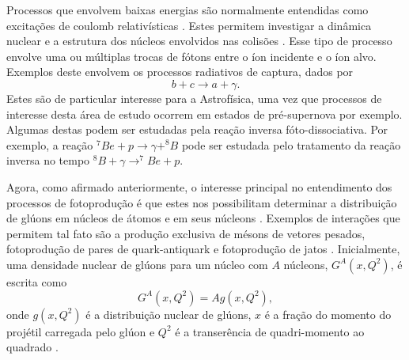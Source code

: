 \begin{table}[h]
\end{table}

Processos que envolvem baixas energias são normalmente entendidas como
excitações de coulomb relativísticas \cite{BERTULANI1988299}. Estes permitem
investigar a dinâmica nuclear e a estrutura dos núcleos envolvidos nas colisões
\cite{bertulani2005}.  Esse tipo de processo envolve uma ou múltiplas trocas
de fótons entre o íon incidente e o íon alvo. Exemplos deste envolvem os
processos radiativos de captura, dados por
\begin{equation}
	b + c \rightarrow a  + \gamma.
\end{equation}
Estes são de particular interesse para a Astrofísica, uma vez que processos de
interesse desta área de estudo ocorrem em estados de pré-supernova por exemplo.
Algumas destas podem ser estudadas pela reação inversa fóto-dissociativa.  Por
exemplo, a reação $^7 Be + p \rightarrow \gamma + ^8B$ pode ser estudada pelo
tratamento da reação inversa no tempo $^8B + \gamma \rightarrow ^7Be + p$.

Agora, como afirmado anteriormente, o interesse principal no entendimento dos
processos de fotoprodução é que estes nos possibilitam determinar a
distribuição de glúons em núcleos de átomos e em seus núcleons
\cite{BALTZ20081}. Exemplos de interações que permitem tal fato são a produção
exclusiva de mésons de vetores pesados, fotoprodução de pares de
quark-antiquark e fotoprodução de jatos \cite{KRAUSS1997503}. Inicialmente, uma
densidade nuclear de glúons para um núcleo com $A$ núcleons, $G^A(x,Q^2)$, é
escrita como
\begin{equation}
	G^A (x,Q^2) = A g(x,Q^2),
\end{equation}
onde $g(x,Q^2)$ é a distribuição nuclear de glúons, $x$ é a fração do momento
do projétil carregada pelo glúon e $Q^2$ é a transerência de quadri-momento ao
quadrado \cite{bertulani2005}.
